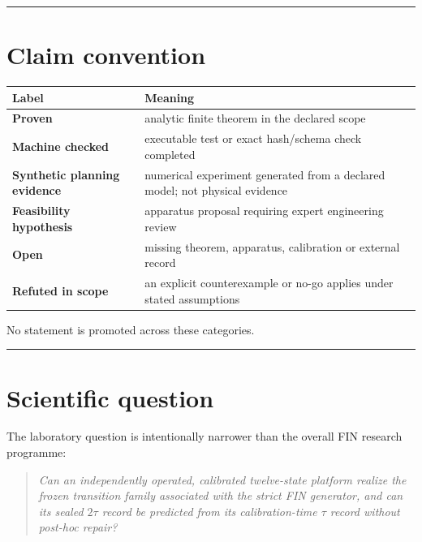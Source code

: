 \documentclass[11pt,a4paper,openany]{report}
\begin{document}
\par\medskip\hrule\medskip

\chapter{Claim convention}

\begin{center}
\begingroup\small
\setlength{\tabcolsep}{3.5pt}
\renewcommand{\arraystretch}{1.16}
\begin{longtable}{@{}p{}p{}@{}}
\toprule
\textbf{Label} & \textbf{Meaning} \\
\midrule
\endhead
\textbf{Proven} & analytic finite theorem in the declared scope \\
\textbf{Machine checked} & executable test or exact hash/\allowbreak{}schema check completed \\
\textbf{Synthetic planning evidence} & numerical experiment generated from a declared model; not physical evidence \\
\textbf{Feasibility hypothesis} & apparatus proposal requiring expert engineering review \\
\textbf{Open} & missing theorem, apparatus, calibration or external record \\
\textbf{Refuted in scope} & an explicit counterexample or no-go applies under stated assumptions \\
\bottomrule
\end{longtable}
\endgroup
\end{center}

No statement is promoted across these categories.

\par\medskip\hrule\medskip

\chapter{Scientific question}

The laboratory question is intentionally narrower than the overall FIN research programme:

\begin{quote}\itshape
Can an independently operated, calibrated twelve-state platform realize the frozen transition family associated with the strict FIN generator, and can its sealed \(2\tau\) record be predicted from its calibration-time \(\tau\) record without post-hoc repair?

\end{quote}
\end{document}
